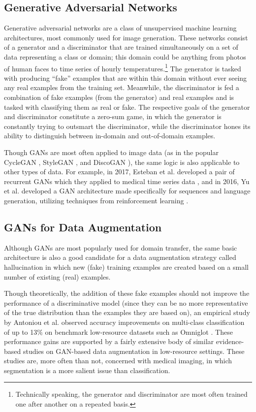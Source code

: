\documentclass{article}
\begin{document}
    \subsection{Generative Adversarial Networks}
      Generative adversarial networks are a class of unsupervised machine learning architectures, most commonly used for image generation. These networks consist of a generator and a discriminator that are trained simultaneously on a set of data representing a class or domain; this domain could be anything from photos of human faces to time series of hourly temperatures.\footnote{Technically speaking, the generator and discriminator are most often trained one after another on a repeated basis.} The generator is tasked with producing ``fake'' examples that are within this domain without ever seeing any real examples from the training set. Meanwhile, the discriminator is fed a combination of fake examples (from the generator) and real examples and is tasked with classifying them as real or fake. The respective goals of the generator and discriminator constitute a zero-sum game, in which the generator is constantly trying to outsmart the discriminator, while the discriminator hones its ability to distinguish between in-domain and out-of-domain examples.

      Though GANs are most often applied to image data (as in the popular CycleGAN \cite{cyclegan}, StyleGAN \cite{stylegan}, and DiscoGAN \cite{discogan}), the same logic is also applicable to other types of data. For example, in 2017, Esteban et al. developed a pair of recurrent GANs which they applied to medical time series data \cite{rcgan}, and in 2016, Yu et al. developed a GAN architecture made specifically for sequences and language generation, utilizing techniques from reinforcement learning \cite{seqgan}.

    \subsection{GANs for Data Augmentation}
      Although GANs are most popularly used for domain transfer, the same basic architecture is also a good candidate for a data augmentation strategy called hallucination in which new (fake) training examples are created based on a small number of existing (real) examples.

      Though theoretically, the addition of these fake examples should not improve the performance of a discriminative model (since they can be no more representative of the true distribution than the examples they are based on), an empirical study by Antoniou et al. observed accuracy improvements on multi-class classification of up to 13\% on benchmark low-resource datasets such as Omniglot \cite{antoniou}. These performance gains are supported by a fairly extensive body of similar evidence-based studies on GAN-based data augmentation in low-resource settings. These studies are, more often than not, concerned with medical imaging, in which segmentation is a more salient issue than classification.
\end{document}

